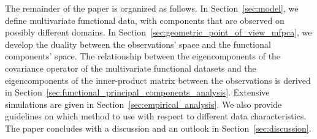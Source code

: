The remainder of the paper is organized as follows. In Section~\ref{sec:model}, we define multivariate functional data, with components that are observed on possibly different domains. In Section~\ref{sec:geometric_point_of_view_mfpca}, we develop the duality between the observations' space and the functional components' space. The relationship between the eigencomponents of the covariance operator of the multivariate functional datasets and the eigencomponents of the inner-product matrix between the observations is derived in Section~\ref{sec:functional_principal_components_analysis}. Extensive simulations are given in Section~\ref{sec:empirical_analysis}. We also provide guidelines on which method to use with respect to different data characteristics. The paper concludes with a discussion and an outlook in Section~\ref{sec:discussion}.

